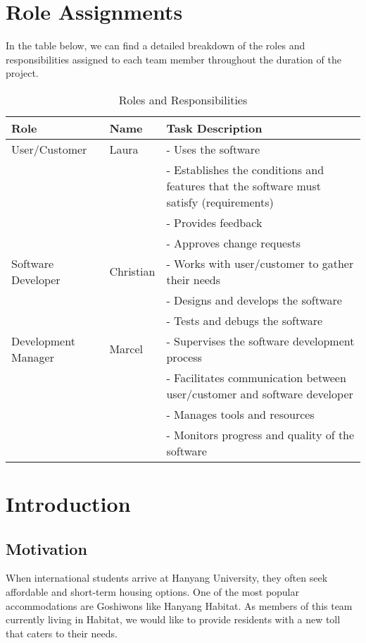\documentclass[conference]{IEEEtran}
\begin{document}
\section*{Role Assignments}
In the table below, we can find a detailed breakdown of the roles and responsibilities assigned to each team member throughout the duration of the project.
\begin{table}[htbp]
\centering
\begin{tabular}{|p{1.7cm}|l|p{4.5cm}|}
\hline
\textbf{Role} & \textbf{Name} & \textbf{Task Description}\\
\hline
User/Customer & Laura & 
- Uses the software \\
& & 
- Establishes the conditions and features that the software must satisfy (requirements) \\
& & 
- Provides feedback \\
& & 
- Approves change requests\\
\hline
Software Developer & Christian & 
- Works with user/customer to gather their needs \\
& & 
- Designs and develops the software \\
& & 
- Tests and debugs the software\\
\hline
Development Manager & Marcel & 
- Supervises the software development process \\
& & 
- Facilitates communication between user/customer and software developer \\
& & 
- Manages tools and resources \\
& & 
- Monitors progress and quality of the software\\
\hline
\end{tabular}
\caption{Roles and Responsibilities}
\label{tab1}
\end{table}



\section{Introduction}
\subsection{Motivation}
When international students arrive at Hanyang University, they often seek affordable and short-term housing options. One of the most popular accommodations are Goshiwons like Hanyang Habitat. As members of this team currently living in Habitat, we would like to provide residents with a new toll that caters to their needs.
\end{document}
